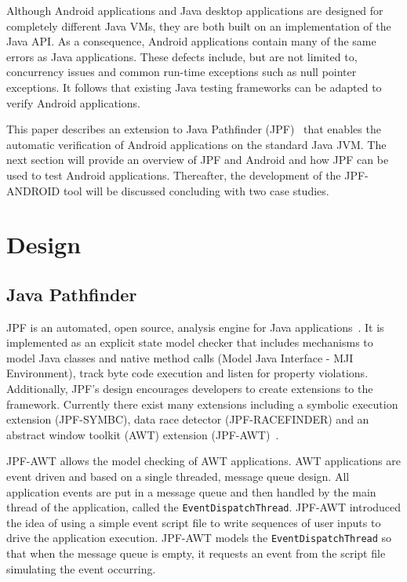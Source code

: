 \documentclass{acm_proc_article-sp}
\begin{document}
Although Android applications and Java desktop applications are designed for completely different Java VMs, they are both built on an
implementation of the Java API. As a consequence, Android applications contain many of the same errors as Java applications. These defects
include, but are not limited to, concurrency issues and common run-time exceptions such as null pointer exceptions. It follows that
existing Java testing frameworks can be adapted to verify Android applications.

This paper describes an extension to Java Pathfinder (JPF)~\cite{JPFDocs} that enables the automatic verification of Android applications on
the standard Java JVM. The next section will provide an overview of JPF and Android and how JPF can be used to test Android applications.
Thereafter, the development of the JPF-ANDROID tool will be discussed concluding with two case studies.

\section{Design}
\subsection{Java Pathfinder}
JPF is an automated, open source, analysis engine for Java applications~\cite{JPFDocs}. It is implemented as an explicit state model checker
that includes mechanisms to model Java classes and native method calls (Model Java Interface - MJI Environment), track byte code execution
and listen for property violations. Additionally, JPF's design encourages developers to create extensions to the framework. Currently there
exist many extensions including a symbolic execution extension (JPF-SYMBC), data race
detector (JPF-RACEFINDER) and an abstract window toolkit (AWT) extension (JPF-AWT)~\cite{JPF-AWT}.

JPF-AWT allows the model checking of AWT applications. AWT applications are event driven and based on a single
threaded, message queue design. All application events are put in a message queue and then handled by the main thread of the application,
called the \texttt{EventDispatchThread}. JPF-AWT introduced the idea of using a simple event script file to write sequences of user inputs
to drive the application execution. JPF-AWT models the \texttt{EventDispatchThread} so that when the message queue is empty, it requests an
event from the script file simulating the event occurring. 
\end{document}
